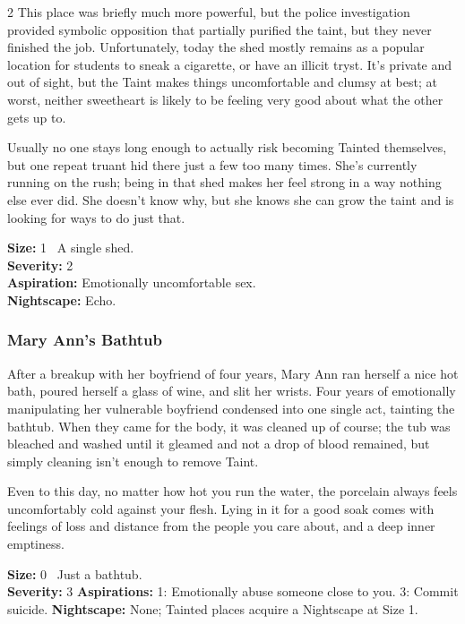\begin{multicols}{2}
This place was briefly much more powerful, but the police investigation provided symbolic opposition that partially purified the taint, but they never finished the job. Unfortunately, today the shed mostly remains as a popular location for students to sneak a cigarette, or have an illicit tryst. It’s private and out of sight, but the Taint makes things uncomfortable and clumsy at best; at worst, neither sweetheart is likely to be feeling very good about what the other gets up to.

Usually no one stays long enough to actually risk becoming Tainted themselves, but one repeat truant hid there just a few too many times. She's currently running on the rush; being in that shed makes her feel strong in a way nothing else ever did. She doesn't know why, but she knows she can grow the taint and is looking for ways to do just that.

\textbf{Size:} 1 \textemdash\, A single shed.\\
\textbf{Severity:} 2\\
\textbf{Aspiration:} Emotionally uncomfortable sex.\\
\textbf{Nightscape:} Echo.

\subsubsection*{Mary Ann's Bathtub}
After a breakup with her boyfriend of four years, Mary Ann ran herself a nice hot bath, poured herself a glass of wine, and slit her wrists. Four years of emotionally manipulating her vulnerable boyfriend condensed into one single act, tainting the bathtub. When they came for the body, it was cleaned up of course; the tub was bleached and washed until it gleamed and not a drop of blood remained, but simply cleaning isn't enough to remove Taint.

Even to this day, no matter how hot you run the water, the porcelain always feels uncomfortably cold against your flesh. Lying in it for a good soak comes with feelings of loss and distance from the people you care about, and a deep inner emptiness.

\textbf{Size:} 0 \textemdash\, Just a bathtub.\\
\textbf{Severity:} 3
\textbf{Aspirations:} 1: Emotionally abuse someone close to you. 3: Commit suicide.
\textbf{Nightscape:} None; Tainted places acquire a Nightscape at Size 1.


\end{multicols}

